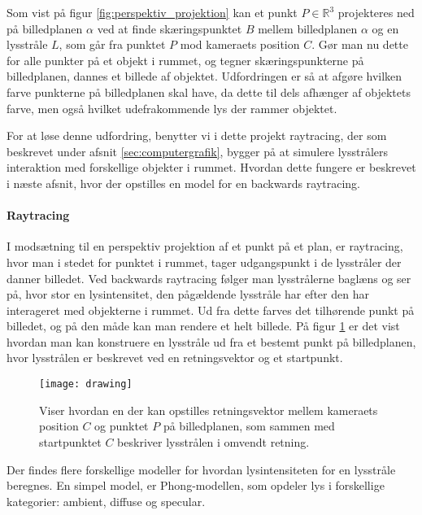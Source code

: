 Som vist på figur \ref{fig:perspektiv_projektion} kan et punkt $P\in \mathbb{R}^3$ projekteres ned på billedplanen $\alpha$ ved at finde skæringspunktet $B$ mellem billedplanen $\alpha$ og en lysstråle $L$, som går fra punktet $P$ mod kameraets position $C$. Gør man nu dette for alle punkter på et objekt i rummet, og tegner skæringspunkterne på billedplanen, dannes et billede af objektet. Udfordringen er så at afgøre hvilken farve punkterne på billedplanen skal have, da dette til dels afhænger af objektets farve, men også hvilket udefrakommende lys der rammer objektet. 

For at løse denne udfordring, benytter vi i dette projekt raytracing, der som beskrevet under afsnit \ref{sec:computergrafik}, bygger på at simulere lysstrålers interaktion med forskellige objekter i rummet. Hvordan dette fungere er beskrevet i næste afsnit, hvor der opstilles en model for en backwards raytracing.

\paragraph{Raytracing}
I modsætning til en perspektiv projektion af et punkt på et plan, er raytracing, hvor man i stedet for punktet i rummet, tager udgangspunkt i de lysstråler der danner billedet. Ved backwards raytracing følger man lysstrålerne baglæns og ser på, hvor stor en lysintensitet, den pågældende lysstråle har efter den har interageret med objekterne i rummet. Ud fra dette farves det tilhørende punkt på billedet, og på den måde kan man rendere et helt billede. På figur \ref{fig:raytracing_skitse} er det vist hvordan man kan konstruere en lysstråle ud fra et bestemt punkt på billedplanen, hvor lysstrålen er beskrevet ved en retningsvektor og et startpunkt.

\begin{figure}[H]
  \label{fig:raytracing_skitse}
  \centering
  \texttt{[image: drawing]}
  \caption{Viser hvordan en der kan opstilles retningsvektor mellem kameraets position $C$ og punktet $P$ på billedplanen, som sammen med startpunktet $C$ beskriver lysstrålen i omvendt retning.}
\end{figure}

Der findes flere forskellige modeller for hvordan lysintensiteten for en lysstråle beregnes. En simpel model, er Phong-modellen, som opdeler lys i forskellige kategorier: ambient, diffuse og specular.

